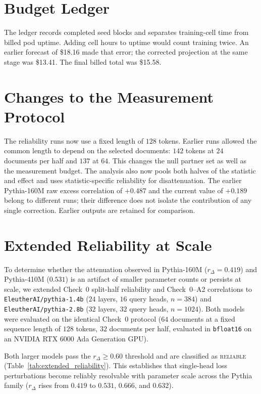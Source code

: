 \documentclass{article} %
\begin{document}
\section{Budget Ledger}
\label{app:budget}

The ledger records completed seed blocks and separates training-cell time
from billed pod uptime. Adding cell hours to uptime would count training
twice. An earlier forecast of \$18.16 made that error; the corrected
projection at the same stage was \$13.41. The final billed total was
\$15.58.

\section{Changes to the Measurement Protocol}
\label{app:deviations}

The reliability runs now use a fixed length of $128$ tokens. Earlier runs
allowed the common length to depend on the selected documents: $142$ tokens
at $24$ documents per half and $137$ at $64$. This changes the null partner
set as well as the measurement budget. The analysis also now pools both
halves of the statistic and effect and uses statistic-specific reliability
for disattenuation. The earlier Pythia-160M raw excess correlation of
$+0.487$ and the current value of $+0.189$ belong to different runs;
their difference does not isolate the contribution of any single correction.
Earlier outputs are retained for comparison.

\section{Extended Reliability at Scale}
\label{app:extended_reliability}

To determine whether the attenuation observed in Pythia-160M ($r_\Delta = 0.419$) and Pythia-410M ($0.531$) is an artifact of smaller parameter counts or persists at scale, we extended Check~0 split-half reliability and Check~0--A2 correlations to \texttt{EleutherAI/pythia-1.4b} ($24$ layers, $16$ query heads, $n = 384$) and \texttt{EleutherAI/pythia-2.8b} ($32$ layers, $32$ query heads, $n = 1024$). Both models were evaluated on the identical Check~0 protocol ($64$ documents at a fixed sequence length of $128$ tokens, $32$ documents per half, evaluated in \texttt{bfloat16} on an NVIDIA RTX 6000 Ada Generation GPU).

Both larger models pass the $r_\Delta \ge 0.60$ threshold and are classified as \textsc{reliable} (Table~\ref{tab:extended_reliability}). This establishes that single-head loss perturbations become reliably resolvable with parameter scale across the Pythia family ($r_\Delta$ rises from $0.419$ to $0.531$, $0.666$, and $0.632$).
\end{document}
